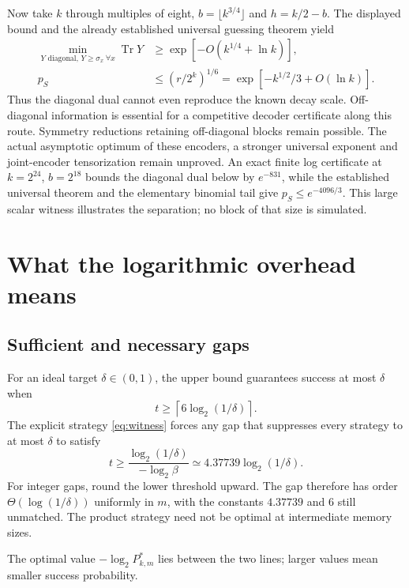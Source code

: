 \documentclass[11pt,a4paper]{article}
\newcommand{\Tr}{\operatorname{Tr}}
\newcommand{\newsection}[1]{\section{#1}}
\begin{document}
Now take $k$ through multiples of eight, $b=\lfloor k^{3/4}\rfloor$ and $h=k/2-b$. The displayed bound and the already established universal guessing theorem yield
\[
\begin{aligned}
\min_{Y\text{ diagonal},\,Y\ge\sigma_x\ \forall x}\Tr Y
&\ge\exp[-O(k^{1/4}+\ln k)],\\
p_S&\le(r/2^k)^{1/6}
=\exp[-k^{1/2}/3+O(\ln k)].
\end{aligned}
\]
Thus the diagonal dual cannot even reproduce the known decay scale. Off-diagonal information is essential for a competitive decoder certificate along this route. Symmetry reductions retaining off-diagonal blocks remain possible. The actual asymptotic optimum of these encoders, a stronger universal exponent and joint-encoder tensorization remain unproved. An exact finite log certificate at $k=2^{24}$, $b=2^{18}$ bounds the diagonal dual below by $e^{-831}$, while the established universal theorem and the elementary binomial tail give $p_S\le e^{-4096/3}$. This large scalar witness illustrates the separation; no block of that size is simulated.

\newsection{What the logarithmic overhead means}
\label{sec:overhead}
\subsection{Sufficient and necessary gaps}
For an ideal target $\delta\in(0,1)$, the upper bound guarantees success at most $\delta$ when
\[
t\geq\left\lceil6\log_2(1/\delta)\right\rceil.
\]
The explicit strategy \eqref{eq:witness} forces any gap that suppresses every strategy to at most $\delta$ to satisfy
\[
t\geq\frac{\log_2(1/\delta)}{-\log_2\beta}
\simeq4.37739\log_2(1/\delta).
\]
For integer gaps, round the lower threshold upward. The gap therefore has order $\Theta(\log(1/\delta))$ uniformly in $m$, with the constants $4.37739$ and $6$ still unmatched. The product strategy need not be optimal at intermediate memory sizes.

\begin{center}
\end{center}
\smallskip
The optimal value $-\log_2 P^*_{k,m}$ lies between the two lines; larger values mean smaller success probability.
\end{document}
